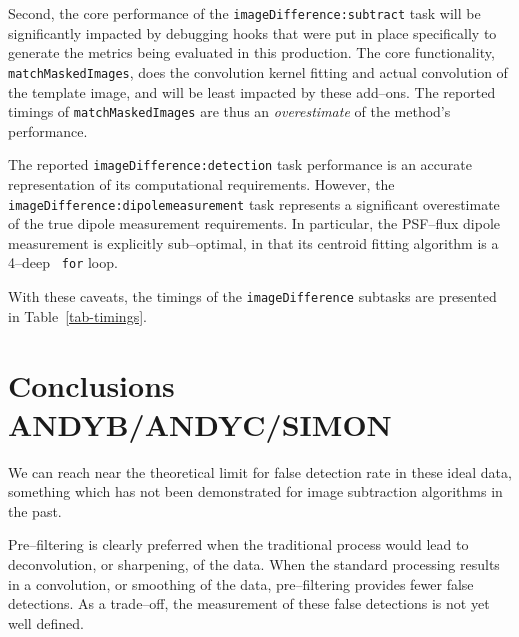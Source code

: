 \documentclass[prd, nofootinbib, floatfix, 11pt,tightenlines,times]{article}
\begin{document}
Second, the core performance of the {\tt imageDifference:subtract}
task will be significantly impacted by debugging hooks that were put
in place specifically to generate the metrics being evaluated in this
production.  The core functionality, {\tt matchMaskedImages}, does the
convolution kernel fitting and actual convolution of the template
image, and will be least impacted by these add--ons.  The reported
timings of {\tt matchMaskedImages} are thus an {\it overestimate} of
the method's performance.

The reported {\tt imageDifference:detection} task performance is an
accurate representation of its computational requirements.  However,
the {\tt imageDifference:dipolemeasurement} task represents a
significant overestimate of the true dipole measurement requirements.
In particular, the PSF--flux dipole measurement is explicitly
sub--optimal, in that its centroid fitting algorithm is a 4--deep {\tt
  for} loop.

With these caveats, the timings of the {\tt imageDifference} subtasks
are presented in Table~\ref{tab-timings}.

\section{Conclusions {\bf ANDYB/ANDYC/SIMON}}

We can reach near the theoretical limit for false detection rate in
these ideal data, something which has not been demonstrated for image
subtraction algorithms in the past.

Pre--filtering is clearly preferred when the traditional process would
lead to deconvolution, or sharpening, of the data.  When the standard
processing results in a convolution, or smoothing of the data,
pre--filtering provides fewer false detections.  As a trade--off, the
measurement of these false detections is not yet well defined.
\end{document}
